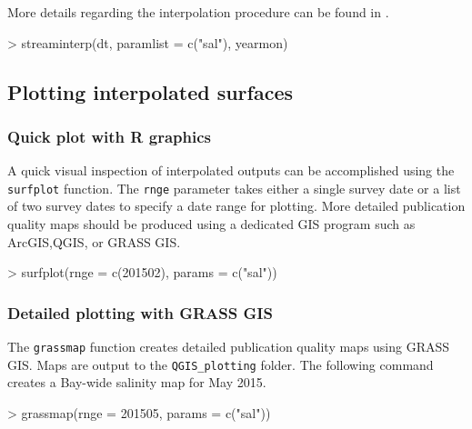 \documentclass[12pt]{article}
\begin{document}
More details regarding the interpolation procedure can be found in \cite{stachelek2015application}.

\begin{Schunk}
\begin{Sinput}
> streaminterp(dt, paramlist = c("sal"), yearmon)
\end{Sinput}
\end{Schunk}

\subsection{\label{sec:plottingsurf}Plotting interpolated surfaces}

\subsubsection{Quick plot with R graphics}

A quick visual inspection of interpolated outputs can be accomplished using the \nohyphens{\texttt{surfplot}} function. The \texttt{rnge} parameter takes either a single survey date or a list of two survey dates to specify a date range for plotting. More detailed publication quality maps should be produced using a dedicated GIS program such as ArcGIS,QGIS, or GRASS GIS.

\begin{Schunk}
\begin{Sinput}
> surfplot(rnge = c(201502), params = c("sal"))
\end{Sinput}
\end{Schunk}



\subsubsection{Detailed plotting with GRASS GIS}

The \texttt{grassmap} function creates detailed publication quality maps using GRASS GIS. Maps are output to the \verb|QGIS_plotting| folder. The following command creates a Bay-wide salinity map for May 2015.

\begin{Schunk}
\begin{Sinput}
> grassmap(rnge = 201505, params = c("sal"))
\end{Sinput}
\end{Schunk}
\end{document}
